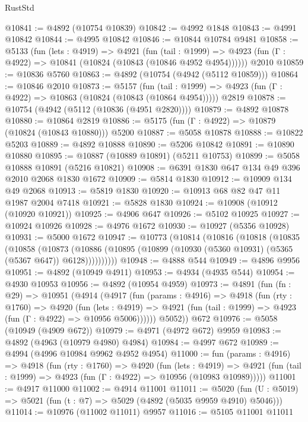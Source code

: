 \begin{lexlean}{RustStd}
\begin{coremodule}
@10841 := @4892 (@10754 @10839)
@10842 := @4992 @1848
@10843 := @4991 @10842
@10844 := @4995 @10842
@10846 := @10844 @10784 @9481
@10858 := @5133
    (fun (lets : @4919) =>
    @4921
      (fun (tail : @1999) =>
      @4923 (fun (Γ : @4922) => @10841 (@10824 (@10843 (@10846 @4952 @4954))))))
    @2010
@10859 := @10836 @5760
@10863 := @4892 (@10754 (@4942 (@5112 @10859)))
@10864 := @10846 @2010
@10873 := @5157
    (fun (tail : @1999) => @4923 (fun (Γ : @4922) => @10863 (@10824 (@10843 (@10864 @4954)))))
    @2819
@10878 := @10754 (@4942 (@5112 (@10836 (@4951 @2820))))
@10879 := @4892 @10878
@10880 := @10864 @2819
@10886 := @5175 (fun (Γ : @4922) => @10879 (@10824 (@10843 @10880))) @5200
@10887 := @5058 @10878
@10888 := @10822 @5203
@10889 := @4892 @10888
@10890 := @5206 @10842
@10891 := @10890 @10880
@10895 := @10887 (@10889 @10891) (@5211 @10753)
@10899 := @5058 @10888 @10891 (@5216 @10821)
@10908 := @6391 @1830 @647 @134 @49 @396 @2010 @2068 @1830 @1672
@10909 := @5814 @1830
@10912 := @10909 @134 @49 @2068
@10913 := @5819 @1830
@10920 := @10913 @68 @82 @47 @11 @1987 @2004 @7418
@10921 := @5828 @1830
@10924 := @10908 (@10912 (@10920 @10921))
@10925 := @4906 @647
@10926 := @5102 @10925
@10927 := @10924 @10926
@10928 := @4976 @1672
@10930 := @10927 (@5356 @10928)
@10931 := @5000 @1672
@10947 := @10773
    (@10814
      (@10816
        (@10818
          (@10835
            (@10858
              (@10873
                (@10886 (@10895 (@10899 (@10930 (@5360 @10931) (@5365 (@5367 @647)) @6128))))))))))
@10948 := @4888 @544
@10949 := @4896 @9956
@10951 := @4892 (@10949 @4911)
@10953 := @4934 (@4935 @544)
@10954 := @4930 @10953
@10956 := @4892 (@10954 @4959)
@10973 := @4891
    (fun (fn : @29) =>
    @10951
      (@4914
        (@4917
          (fun (params : @4916) =>
          @4918
            (fun (rty : @1760) =>
            @4920
              (fun (lets : @4919) =>
              @4921 (fun (tail : @1999) => @4923 (fun (Γ : @4922) => @10956 @5006))))))
        @5052))
    @672
@10976 := @5058 (@10949 (@4909 @672))
@10979 := @4971 (@4972 @672) @9959
@10983 := @4892 (@4963 (@10979 @4980) @4984)
@10984 := @4997 @672
@10989 := @4994 (@4996 @10984 @9962 @4952 @4954)
@11000 := fun (params : @4916) =>
  @4918
    (fun (rty : @1760) =>
    @4920
      (fun (lets : @4919) =>
      @4921 (fun (tail : @1999) => @4923 (fun (Γ : @4922) => @10956 (@10983 @10989)))))
@11001 := @4917 @11000
@11002 := @4914 @11001
@11011 := @5020 (fun (U : @5019) => @5021 (fun (t : @7) => @5029 (@4892 (@5035 @9959 @4910) @5046)))
@11014 := @10976 (@11002 @11011) @9957
@11016 := @5105 @11001 @11011

\end{coremodule}
\end{lexlean}
